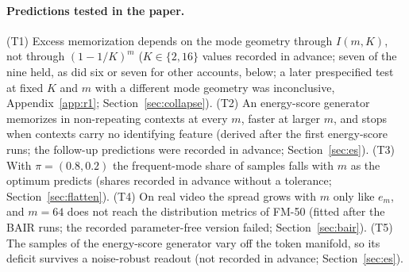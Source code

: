 \paragraph{Predictions tested in the paper.} (T1) Excess memorization depends on the mode geometry through $I(m,K)$, not through $(1-1/K)^m$ ($K \in \{2,16\}$ values recorded in advance; seven of the nine held, as did six or seven for other accounts, below; a later prespecified test at fixed $K$ and $m$ with a different mode geometry was inconclusive, Appendix~\ref{app:r1}; Section~\ref{sec:collapse}). (T2) An energy-score generator memorizes in non-repeating contexts at every $m$, faster at larger $m$, and stops when contexts carry no identifying feature (derived after the first energy-score runs; the follow-up predictions were recorded in advance; Section~\ref{sec:es}). (T3) With $\pi = (0.8, 0.2)$ the frequent-mode share of \imlewm{} samples falls with $m$ as the optimum predicts (shares recorded in advance without a tolerance; Section~\ref{sec:flatten}). (T4) On real video the spread grows with $m$ only like $e_m$, and $m{=}64$ does not reach the distribution metrics of FM-50 (fitted after the BAIR runs; the recorded parameter-free version failed; Section~\ref{sec:bair}). (T5) The samples of the energy-score generator vary off the token manifold, so its deficit survives a noise-robust readout (not recorded in advance; Section~\ref{sec:es}).

